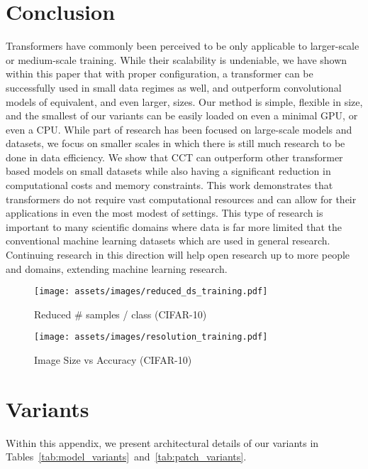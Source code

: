 \documentclass[10pt,twocolumn,letterpaper]{article}
\begin{document}
\section{Conclusion}
Transformers have commonly been perceived to be only applicable to larger-scale or medium-scale training.
While their scalability is undeniable, we have shown within this paper that with proper configuration, a transformer can be successfully used in  small data regimes as well, and outperform convolutional models of equivalent, and even larger, sizes.
Our method is simple, flexible in size, and the smallest of our variants can be easily loaded on even a minimal GPU, or even a CPU.
While part of research has been focused on large-scale models and datasets, we focus on smaller scales in which there is still much research to be done in data efficiency.
We show that CCT can outperform other transformer based models on small datasets while also having a significant reduction in computational costs and memory constraints.
This work demonstrates that transformers do not require vast computational resources and can allow for their applications in even the most modest of settings.
This type of research is important to many scientific domains where data is far more limited that the conventional machine learning datasets which are used in general research.
Continuing research in this direction will help open research up to more people and domains, extending machine learning research.




\clearpage

\appendix

\begin{figure*}[ht!]
\centering
\begin{minipage}{.49\textwidth}
    \centering
    \texttt{[image: assets/images/reduced\_ds\_training.pdf]}
    \caption{Reduced \# samples / class (CIFAR-10)}
    \label{fig:redruns}
\end{minipage}
\begin{minipage}{.49\textwidth}
    \centering
    \texttt{[image: assets/images/resolution\_training.pdf]}
    \caption{Image Size vs Accuracy (CIFAR-10)}
    \label{fig:sizeruns}
\end{minipage}
\end{figure*}

\section{Variants}
\label{appdx:model_variants}
Within this appendix, we present architectural details of our variants in Tables~\ref{tab:model_variants}~and~\ref{tab:patch_variants}.
\end{document}
